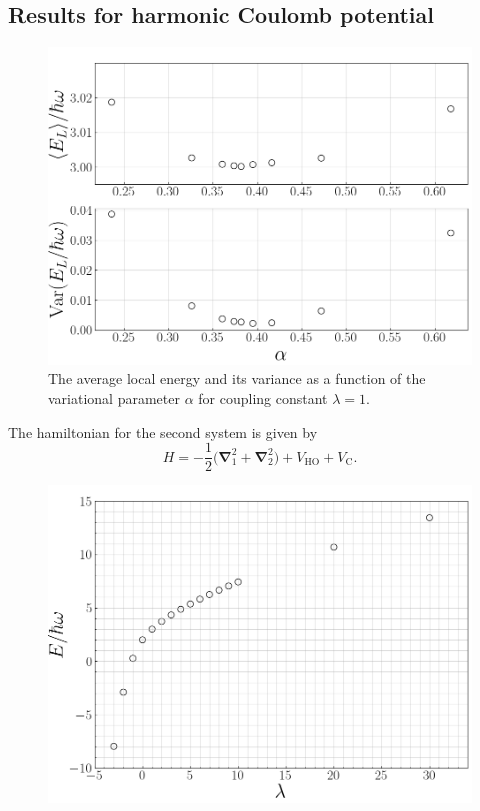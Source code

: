 \documentclass[twocolumn]{article}
\begin{document}
\begin{large}
\subsection*{Results for harmonic Coulomb potential}
\begin{figure}[!b]
    \includegraphics[scale=0.35]{ParamsEnergylambda1.png}
    \caption{The average local energy and its variance as a function of the variational parameter $\alpha$ for coupling constant $\lambda=1$.}
    \label{11apr0919}
\end{figure}
The hamiltonian for the second system is given by
\begin{equation}
    H = -\frac{1}{2}\big(\boldsymbol{\nabla}_1^2+\boldsymbol{\nabla}_2^2\big) + V_\text{HO} + V_\text{C}.
\end{equation}
\begin{figure}[!b]
    \includegraphics[scale=0.35]{LambdaRelationship.png}

\end{figure}
\end{large}
\end{document}
